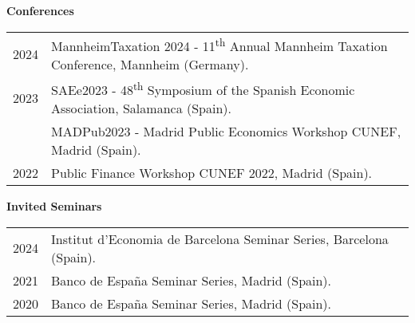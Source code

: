 %
%


\vspace{1.5 mm}

\textbf{Conferences}

\begin{tabular}{rp{}}
	\textsc{2024}	& MannheimTaxation 2024 - 11\textsuperscript{th} Annual Mannheim Taxation Conference, \faMapMarker \hspace{0.5 mm} Mannheim (Germany). \\	
	\textsc{2023}	& SAEe2023 - 48\textsuperscript{th} Symposium of the Spanish Economic Association, \faMapMarker \hspace{0.5 mm} Salamanca (Spain). \\
	\textsc{}	& MADPub2023 - Madrid Public Economics Workshop CUNEF, \faMapMarker \hspace{0.5 mm} Madrid (Spain). \\
	\textsc{2022}	& Public Finance Workshop CUNEF 2022, \faMapMarker \hspace{0.5 mm} Madrid (Spain). \\
								
\end{tabular}


\textbf{Invited Seminars}

\begin{tabular}{rp{}}
	\textsc{2024}	& Institut d'Economia de Barcelona Seminar Series, \faMapMarker \hspace{0.5 mm} Barcelona (Spain).\\
	\textsc{2021}	& Banco de España Seminar Series, \faMapMarker \hspace{0.5 mm} Madrid (Spain). %
	\\
	\textsc{2020}	& Banco de España Seminar Series, \faMapMarker \hspace{0.5 mm} Madrid (Spain). %
	\\

\end{tabular}


